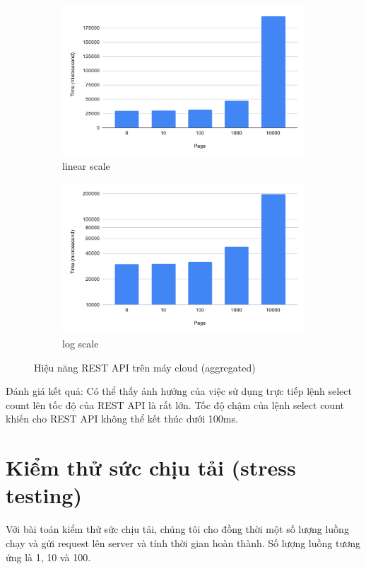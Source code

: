 \begin{figure}[H]
\centering
\begin{subfigure}{0.5\textwidth}
    \centering
    \includegraphics[width=\textwidth]
    {images/testing/view-aggregated-cloud.png}
    \caption{linear scale}
\end{subfigure}%
\begin{subfigure}{0.5\textwidth}
    \centering
    \includegraphics[width=\textwidth]
    {images/testing/view-aggregated-cloud-log.png}
    \caption{log scale}
\end{subfigure}
\caption{Hiệu năng REST API trên máy cloud (aggregated)}
\end{figure}

Đánh giá kết quả: Có thể thấy ảnh hưởng của việc sử dụng
trực tiếp lệnh select count lên tốc độ của REST API là rất lớn.
Tốc độ chậm của lệnh select count khiến cho REST API không thể kết thúc
dưới 100ms.

\section{Kiểm thử sức chịu tải (stress testing)}
Với bài toán kiểm thử sức chịu tải, chúng tôi cho đồng thời
một số lượng luồng chạy và gửi request lên server và
tính thời gian hoàn thành. Số lượng luồng tương ứng
là 1, 10 và 100.

